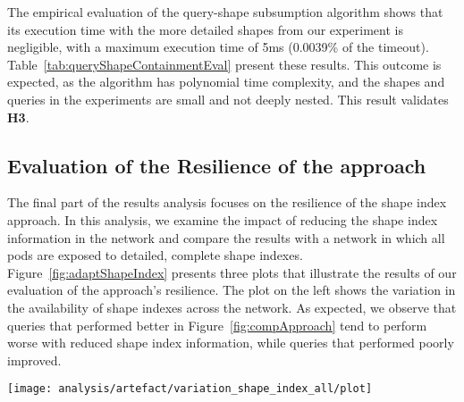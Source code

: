 The empirical evaluation of the query-shape subsumption algorithm shows that its execution time with the more detailed shapes from our experiment is negligible, with a maximum execution time of 5ms (0.0039\% of the timeout).
Table~\ref{tab:queryShapeContainmentEval} present these results.
This outcome is expected, as the algorithm has polynomial time complexity, and the shapes and queries in the experiments are small and not deeply nested.
This result validates \textbf{H3}.


\subsection{Evaluation of the Resilience of the approach}

The final part of the results analysis focuses on the resilience of the shape index approach.
In this analysis, we examine the impact of reducing the shape index information in the network and compare the results with a network in which all pods are exposed to detailed, complete shape indexes.
Figure~\ref{fig:adaptShapeIndex} presents three plots that illustrate the results of our evaluation of the approach's resilience.
The plot on the left shows the variation in the availability of shape indexes across the network. 
As expected, we observe that queries that performed better in Figure~\ref{fig:compApproach} tend to perform worse with reduced shape index information, while queries that performed poorly improved. 


\begin{figure*}
    \centering
    \texttt{[image: analysis/artefact/variation\_shape\_index\_all/plot]}
    \caption{
    Shape index approaches tend to perform less effectively with limited network information and comparatively better where the baseline shape index underperforms.
    A higher ratio indicates a longer query execution time compared to a network with complete shape index information (\textbf{lower is better}).
    }
    \label{fig:adaptShapeIndex}
\end{figure*}


